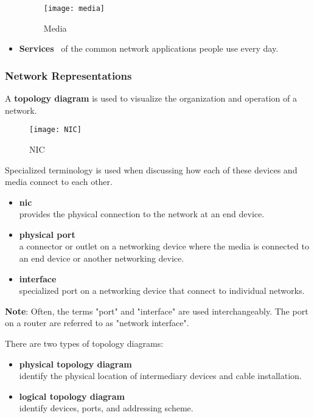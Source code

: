 \documentclass[crop=false]{standalone}
\begin{document}
\begin{itemize}
  \begin{figure}[h]
    \centering
    \texttt{[image: media]}
    \caption{Media}
    \label{fig:Media}
  \end{figure}

  \item \textbf{Services} \ of the common network applications people use every day.
\end{itemize}

\subsubsection{Network Representations}
A \textbf{topology diagram} is used to visualize the organization and operation of a network.

\begin{wrapfigure}{r}{2.5cm}
  \centering
  \texttt{[image: NIC]}
  \caption{NIC}
  \label{fig:Network Interface Card(NIC)}
\end{wrapfigure}

Specialized terminology is used when discussing how each of these devices and media connect to each other.

\begin{itemize}
  \item \textbf{\acrfull{nic}} \\provides the physical connection to the network at an end device. 
  \item \textbf{\Gls{physical port}} \\a connector or outlet on a networking device where the media is connected to an end device or another networking device.
  \item \textbf{\Gls{interface}} \\specialized port on a networking device that connect to individual networks.
\end{itemize}

\textbf{Note}: Often, the terms "port" and "interface" are used interchangeably. The port on a router are referred to as "\gls{network interface}".

There are two types of topology diagrams:
\begin{itemize}
  \item \textbf{\gls{physical topology diagram}} \\identify the physical location of intermediary devices and cable installation.
  \item \textbf{\gls{logical topology diagram}} \\identify devices, ports, and addressing scheme.
\end{itemize}
\end{document}
